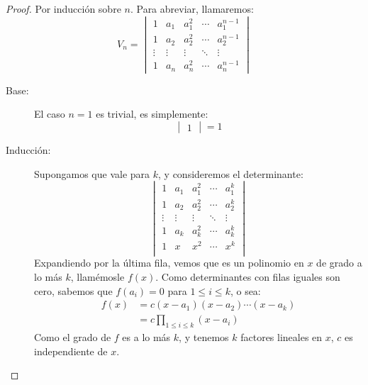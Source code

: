   \begin{proof}
    Por inducción sobre \(n\).
    Para abreviar,
    llamaremos:
    \begin{equation*}
      V_n
        = \begin{vmatrix}
            1 & a_1 & a_1^2 & \cdots & a_1^{n - 1} \\
            1 & a_2 & a_2^2 & \cdots & a_2^{n - 1} \\
            \vdots & \vdots & \vdots & \ddots & \vdots \\
            1 & a_n & a_n^2 & \cdots & a_n^{n - 1}
          \end{vmatrix}
    \end{equation*}
    \begin{description}
    \item[Base:]
      El caso \(n = 1\) es trivial,
      es simplemente:
      \begin{equation*}
        \begin{vmatrix}
          1
        \end{vmatrix}
          = 1
      \end{equation*}
    \item[Inducción:]
      Supongamos que vale para \(k\),
      y consideremos el determinante:
      \begin{equation*}
        \begin{vmatrix}
          1 & a_1 & a_1^2 & \cdots & a_1^k \\
          1 & a_2 & a_2^2 & \cdots & a_2^k \\
          \vdots & \vdots & \vdots & \ddots & \vdots \\
          1 & a_k & a_k^2 & \cdots & a_k^k \\
          1 & x	  & x^2	  & \cdots & x^k \\
        \end{vmatrix}
      \end{equation*}
      Expandiendo por la última fila,
      vemos que es un polinomio en \(x\) de grado a lo más \(k\),
      llamémosle \(f(x)\).
      Como determinantes con filas iguales son cero,
      sabemos que \(f(a_i) = 0\) para \(1 \le i \le k\),
      o sea:
      \begin{align*}
        f(x)
          &= c (x - a_1) (x - a_2) \dotsm (x - a_k) \\
          &= c \prod_{1 \le i \le k} (x - a_i)
      \end{align*}
      Como el grado de \(f\) es a lo más \(k\),
      y tenemos \(k\) factores lineales en \(x\),
      \(c\) es independiente de \(x\).


\end{description}
\end{proof}
